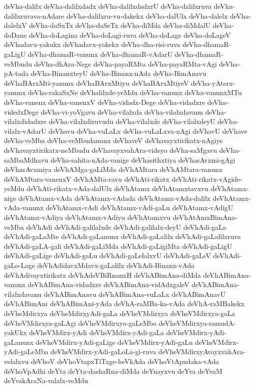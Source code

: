 {deVha-dalilx
deVha-dalilxdadx
deVha-dalilxdadxrU
deVha-dalilxruva
deVha-dalilxruvava-nAdare
deVha-dalilxru-vu-dakekx
deVha-dalUlx
deVha-dalelx
deVha-dalelxV
deVha-daSuTx
deVha-daSeTx
deVha-diMda
deVha-diMdalU
deVha-doDane
deVha-doLagina
deVha-doLagi-ruva
deVha-doLage
deVha-doLageV
deVhadavx-yakukx
deVhadavx-yakekx
deVha-dha-risi-ruva
deVha-dhamaR-gaLigU
deVha-dhamaR-vanunx
deVha-dhamaR-vAdarU
deVha-dhamaR-veMbudu
deVha-dhAra-Nege
deVha-payaRMta
deVha-payaRMta-vAgi
deVha-pA-tada
deVha-BinanxteyU
deVha-Binanx-nAda
deVha-BimAnavu
deVhaBArxMti-yanunx
deVhaBArxMtiyu
deVhaBArxMtiyeV
deVha-yAterx-yanunx
deVha-rakaSxNe
deVhalilxde-yeMdu
deVha-vanunx
deVha-vanunxMTu
deVha-vanenx
deVha-vanenxV
deVha-vidadx-Dege
deVha-vidadxre
deVha-videdxDege
deVha-vi-yoVgavu
deVha-vilalxda
deVha-vilalxdavanu
deVha-vilalxdidadxre
deVha-vilalxdiruvudu
deVha-vilalxde
deVha-vilalxdeyU
deVha-vilalx-vAdarU
deVhavu
deVha-vuLaLx
deVha-vuLaLxva-nAgi
deVhavU
deVhave
deVha-veMba
deVha-veMbudanunx
deVhaveV
deVhavayxtirikatx-nAgiye
deVhavayxtirikatx-neMbudu
deVhavayxvahAra-videyo
deVha-saMgavu
deVha-saMbaMdhavu
deVha-sahita-nAda-vanige
deVhasithxtiya
deVhasAvxmi-gAgi
deVhasAvxmiya
deVhAMga-gaLiMda
deVhAMtara
deVhAMtara-vanunx
deVhAMtara-vanenxV
deVhAMta-ravu
deVhAti-rikatx
deVhAti-rikatx-vAgide-yeMdu
deVhAti-rikatx-vAda-dalUlx
deVhAtamx
deVhAtamxtavxvu
deVhAtamx-nige
deVhAtamx-vAda
deVhAtamx-vAdada
deVhAtamx-vAda-dalilx
deVhAtamx-vAda-vanunx
deVhAtamx-vAdi
deVhAtamx-vAdi-gaLu
deVhAtamx-vAdigU
deVhAtamx-vAdiya
deVhAtamx-vAdiyu
deVhAtamxvu
deVhAtAmxBimAna-veMba
deVhAdi
deVhAdi-galilalxde
deVhAdi-galilalx-deyU
deVhAdi-gaLa
deVhAdi-gaLaMte
deVhAdi-gaLanunx
deVhAdi-gaLalilx
deVhAdi-gaLalilxruva
deVhAdi-gaLA-gali
deVhAdi-gaLiMda
deVhAdi-gaLigiMta
deVhAdi-gaLigU
deVhAdi-gaLige
deVhAdi-gaLu
deVhAdi-gaLelalxvU
deVhAdi-gaLeV
deVhAdi-gaLo-Lage
deVhAdidavxMdavx-gaLalilx
deVhAdi-Binanx-vAda
deVhAdivayxtirikatx
deVhAdeVBiRnanxH
deVhABimAna-diMda
deVhABimAna-vanunx
deVhABimAna-vidadxre
deVhABimAna-vidAdxgaleV
deVhABimAna-vilalxdavanu
deVhABimAnavu
deVhABimAna-vuLaLx
deVhABimAnavU
deVhABimAni
deVhABimAni-yAda
deVhA-raMBa-ka-vAda
deVhA-raMBakekx
deVheMdirxya
deVheMdirxyAdi-gaLa
deVheVMdirxya
deVheVMdirxya-gaLa
deVheVMdirxya-gaLAgi
deVheVMdirxya-gaLeMba
deVheVMdirxya-samudA-yakUkx
deVheVMdirx-yAdi
deVheVMdirx-yAdi-gaLa
deVheVMdirx-yAdi-gaLanunx
deVheVMdirx-yAdi-gaLige
deVheVMdirx-yAdi-gaLu
deVheVMdirx-yAdi-gaLeMba
deVheVMdirx-yAdi-gaLoLa-gi-ruva
deVheVMdirxyAvayxvahAra-velalxvu
deVhoV
deVhoVtapxTiTxge-beVkAda
deVhoVtApxdaka-vAda
deVhoVpAdhi
deYta
deYta-dashaRna-diMda
deYnayxvu
deYva
deYvaM
deYvakAraNa-valalx-veMdu
}
